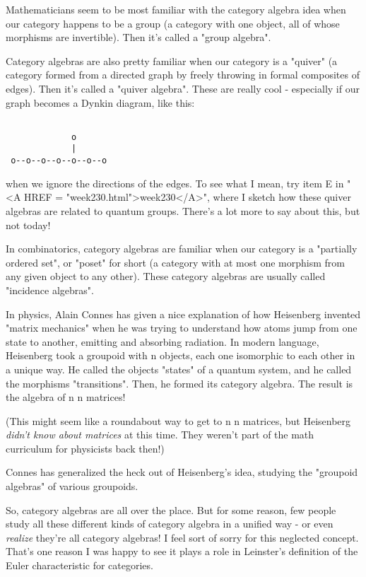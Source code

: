 Mathematicians seem to be most familiar with the category algebra idea 
when our category happens to be a group (a category with one object, all 
of whose morphisms are invertible).  Then it's called a "group 
algebra".

Category algebras are also pretty familiar when our category is a
"quiver" (a category formed from a directed graph by freely
throwing in formal composites of edges).  Then it's called a
"quiver algebra".  These are really cool - especially if our
graph becomes a Dynkin diagram, like this:


\begin{verbatim}

             o
             |
 o--o--o--o--o--o--o
\end{verbatim}
    
when we ignore the directions of the edges.  To see what I mean, try 
item E in "<A HREF = "week230.html">week230</A>", where I sketch how these quiver algebras are 
related to quantum groups.  There's a lot more to say about this, but 
not today!

In combinatorics, category algebras are familiar when our category is
a "partially ordered set", or "poset" for short (a category with at
most one morphism from any given object to any other).  These category
algebras are usually called "incidence algebras".

In physics, Alain Connes has given a nice explanation of how
Heisenberg invented "matrix mechanics" when he was trying to
understand how atoms jump from one state to another, emitting and
absorbing radiation.  In modern language, Heisenberg took a groupoid
with n objects, each one isomorphic to each other in a unique way.  He
called the objects "states" of a quantum system, and he
called the morphisms "transitions".  Then, he formed its
category algebra.  The result is the algebra of n \times  n matrices!

(This might seem like a roundabout way to get to n \times  n matrices,
but Heisenberg \emph{didn't know about matrices} at this time.  They
weren't part of the math curriculum for physicists back then!)

Connes has generalized the heck out of Heisenberg's idea, studying
the "groupoid algebras" of various groupoids.

So, category algebras are all over the place.  But for some reason,
few people study all these different kinds of category algebra in a
unified way - or even \emph{realize} they're all category algebras!
I feel sort of sorry for this neglected concept.  That's one reason I
was happy to see it plays a role in Leinster's definition of the Euler
characteristic for categories.


